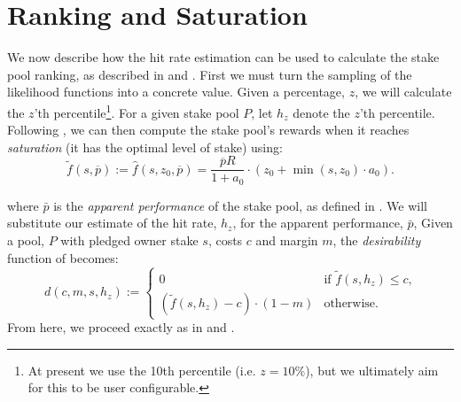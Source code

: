 \documentclass[11pt,a4paper,dvipsnames,twosided]{article}
\newcommand\pbar{\overline{p}}
\begin{document}
\section{Ranking and Saturation}

We now describe how the hit rate estimation can be used to calculate the stake pool ranking,
as described in \cite{bkks2018} and \cite[Section 5.6]{delegation_design}.
First we must turn the sampling of the likelihood functions into a concrete value.
Given a percentage, $z$, we will calculate the $z$'th percentile\footnote{At present we use the 10th percentile (i.e. $z=10\%$), but we ultimately aim for this to be user configurable.}.
For a given stake pool $P$, let $h_z$ denote the $z$'th percentile.
%
Following \cite[Section 5.6.1]{delegation_design},
we can then compute the stake pool's rewards when it reaches \emph{saturation} (it has the optimal level of stake) using:
\[
    \tilde{f}(s, \pbar) :=
    \hat{f}(s,z_0,\pbar)=
    \frac{\pbar R}{1 + a_0}
    \cdot
    \left(z_0 + \min(s,z_0)\cdot a_0\right).
\]

where $\bar{p}$ is the \textit{apparent performance} of the stake pool, as defined in
\cite[Section 5.5.2]{delegation_design}.
We will substitute our estimate of the hit rate, $h_z$, for the apparent performance, $\bar{p}$,
Given a pool, $P$ with pledged owner stake \(s\), costs \(c\) and margin \(m\),
the \emph{desirability} function of \cite[Section 5.6.1]{delegation_design} becomes:
\[
    d(c, m, s, h_z) :=
    \left\{
    \begin{array}{ll}
        \displaystyle 0 &
        \text{if $\tilde{f}(s,h_z)\leq c$,} \\
        \displaystyle\left(\tilde{f}(s,h_z) - c\right)\cdot(1-m) &
        \text{otherwise.}
    \end{array}
    \right.
\]
From here, we proceed exactly as in
\cite[Section 5.6.2]{delegation_design} and
\cite[Section 5.6.4]{delegation_design}.
\end{document}
